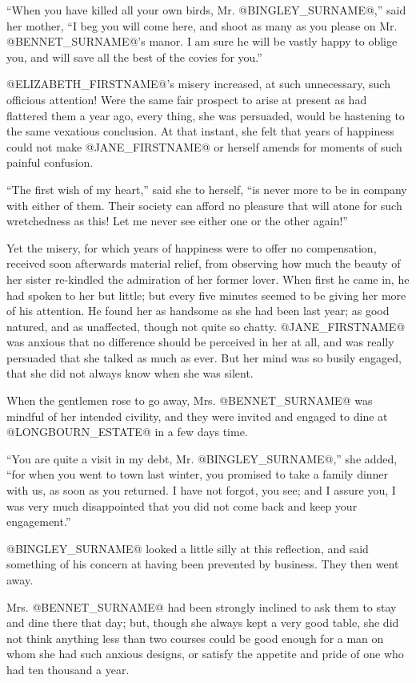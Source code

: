 ``When you have killed all your own birds, Mr. @BINGLEY_SURNAME@,'' said her mother,
``I beg you will come here, and shoot as many as you please on Mr.
@BENNET_SURNAME@'s manor. I am sure he will be vastly happy to oblige you, and
will save all the best of the covies for you.''

@ELIZABETH_FIRSTNAME@'s misery increased, at such unnecessary, such officious
attention! Were the same fair prospect to arise at present as had
flattered them a year ago, every thing, she was persuaded, would be
hastening to the same vexatious conclusion. At that instant, she felt
that years of happiness could not make @JANE_FIRSTNAME@ or herself amends for
moments of such painful confusion.

``The first wish of my heart,'' said she to herself, ``is never more to
be in company with either of them. Their society can afford no pleasure
that will atone for such wretchedness as this! Let me never see either
one or the other again!''

Yet the misery, for which years of happiness were to offer no
compensation, received soon afterwards material relief, from observing
how much the beauty of her sister re-kindled the admiration of her
former lover. When first he came in, he had spoken to her but little;
but every five minutes seemed to be giving her more of his attention. He
found her as handsome as she had been last year; as good natured, and
as unaffected, though not quite so chatty. @JANE_FIRSTNAME@ was anxious that no
difference should be perceived in her at all, and was really persuaded
that she talked as much as ever. But her mind was so busily engaged,
that she did not always know when she was silent.

When the gentlemen rose to go away, Mrs. @BENNET_SURNAME@ was mindful of her
intended civility, and they were invited and engaged to dine at
@LONGBOURN_ESTATE@ in a few days time.

``You are quite a visit in my debt, Mr. @BINGLEY_SURNAME@,'' she added, ``for when
you went to town last winter, you promised to take a family dinner with
us, as soon as you returned. I have not forgot, you see; and I assure
you, I was very much disappointed that you did not come back and keep
your engagement.''

@BINGLEY_SURNAME@ looked a little silly at this reflection, and said something of
his concern at having been prevented by business. They then went away.

Mrs. @BENNET_SURNAME@ had been strongly inclined to ask them to stay and dine
there that day; but, though she always kept a very good table, she did
not think anything less than two courses could be good enough for a man
on whom she had such anxious designs, or satisfy the appetite and pride
of one who had ten thousand a year.



